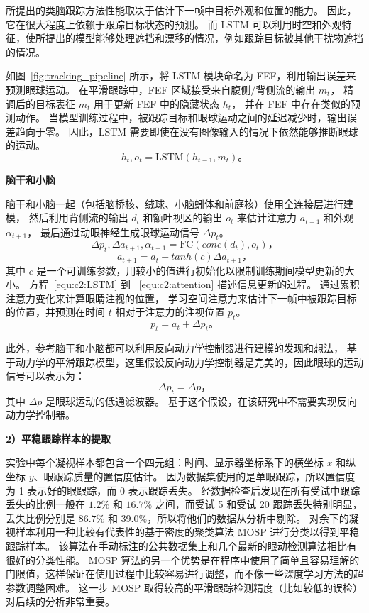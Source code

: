 \documentclass[a4paper,zihao=-4]{article}
\begin{document}
所提出的类脑跟踪方法性能取决于估计下一帧中目标外观和位置的能力。
因此，它在很大程度上依赖于跟踪目标状态的预测。
而 LSTM 可以利用时空和外观特征，使所提出的模型能够处理遮挡和漂移的情况，例如跟踪目标被其他干扰物遮挡的情况。

如图~\ref{fig:tracking_pipeline} 所示，将 LSTM 模块命名为 FEF，利用输出误差来预测眼球运动。
在平滑跟踪中，FEF 区域接受来自腹侧/背侧流的输出 $m_t$，
精调后的目标表征 $m_t$ 用于更新 FEF 中的隐藏状态 $h_t$，
并在 FEF 中存在类似的预测动作。
当模型训练过程中，被跟踪目标和眼球运动之间的延迟减少时，输出误差趋向于零。
因此，LSTM 需要即使在没有图像输入的情况下依然能够推断眼球的运动。
\begin{equation} \label{equ:c2:LSTM}
h_t, o_t = \text{LSTM}(h_{t-1}, m_t) \mbox{。}
\end{equation}


\textbf{脑干和小脑}

脑干和小脑一起（包括脑桥核、绒球、小脑蚓体和前庭核）使用全连接层进行建模，
然后利用背侧流的输出 $d_t$ 和额叶视区的输出 $o_t$ 来估计注意力 $a_{t+1}$ 和外观 $\alpha_{t+1}$，
最后通过动眼神经生成眼球运动信号 $\Delta p_t$。
\begin{equation} \label{equ:c2:FC}
\Delta p_t, \Delta a_{t+1}, \alpha_{t+1} = \text{FC}(conc(d_t), o_t) \mbox{，}
\end{equation}
\begin{equation} \label{equ:c2:attention}
a_{t+1} = a_t + tanh(c) \Delta a_{t+1} \mbox{，}
\end{equation}
其中 $c$ 是一个可训练参数，用较小的值进行初始化以限制训练期间模型更新的大小。
方程~\ref{equ:c2:LSTM} 到 ~\ref{equ:c2:attention} 描述信息更新的过程。
通过累积注意力变化来计算眼睛注视的位置，
学习空间注意力来估计下一帧中被跟踪目标的位置，并预测在时间 $t$ 相对于注意力的注视位置 $p_t$。
\begin{equation}
p_t = a_t + \Delta p_t \mbox{。}
\end{equation}

此外，参考脑干和小脑都可以利用反向动力学控制器进行建模的发现和想法，
基于动力学的平滑跟踪模型，这里假设反向动力学控制器是完美的，因此眼球的运动信号可以表示为：
\begin{equation}
\Delta p_t = \Delta p \mbox{，}
\end{equation}
其中 $\Delta p$ 是眼球运动的低通滤波器。
基于这个假设，在该研究中不需要实现反向动力学控制器。


\textbf{2）平稳跟踪样本的提取}

实验中每个凝视样本都包含一个四元组：时间、显示器坐标系下的横坐标 $x$ 和纵坐标 $y$、眼跟踪质量的置信度估计。
因为数据集使用的是单眼跟踪，所以置信度为 1 表示好的眼跟踪，而 0 表示跟踪丢失。
经数据检查后发现在所有受试中跟踪丢失的比例一般在 $1.2\%$ 和 $16.7\%$ 之间，而受试 5 和受试 20 跟踪丢失特别明显，丢失比例分别是 $86.7\%$ 和 $39.0\%$，所以将他们的数据从分析中剔除。
%
对余下的凝视样本利用一种比较有代表性的基于密度的聚类算法 MOSP 进行分类以得到平稳跟踪样本。
该算法在手动标注的公共数据集上和几个最新的眼动检测算法相比有很好的分类性能。
MOSP 算法的另一个优势是在程序中使用了简单且容易理解的门限值，这样保证在使用过程中比较容易进行调整，而不像一些深度学习方法的超参数调整困难。
这一步 MOSP 取得较高的平滑跟踪检测精度（比如较低的误检）对后续的分析非常重要。
\end{document}
